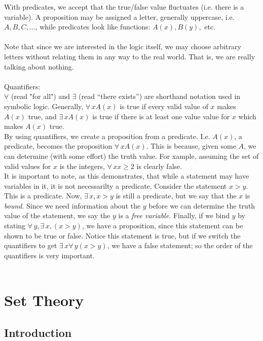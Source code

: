 \documentclass[12pt]{report}
\begin{document}
With predicates, we accept that the true/false value fluctuates (i.e. there is
a variable). A proposition may be assigned a letter, generally uppercase, 
i.e. $A,B,C,...$, while predicates look like functions: $A(x),B(y),$ etc.\\
\\
Note that since we are interested in the logic itself, we may choose arbitrary
letters without relating them in any way to the real world. That is, we are
really talking about nothing. \\
\\
Quantifiers:\\
\indent 
$\forall$ (read "for all") and $\exists$ (read ``there exists'') are shorthand
notation used in symbolic logic. Generally, $\forall\, x A(x)$ is true if every
valid value of $x$ makes $A(x)$ true, and $\exists\, x A(x)$ is true if there is
at least one value value for $x$ which makes $A(x)$ true.  \\
\indent 
By using quantifiers, we create a proposition from a predicate. I.e. $A(x)$, a
predicate, becomes the proposition $\forall\, x A(x)$. This is because, given
some $A$, we can determine (with some effort) the truth value. For xample,
assuming the set of valid values for $x$ is the integers, $\forall\, x x\ge 2$
is clearly false. \\
\indent 
It is important to note, as this demonstrates, that while
a statement may have variables in it, it is not necessarilty a predicate.
Consider the statement $x>y$. This is a predicate. Now, $\exists\, x, x>y$ is
still a predicate, but we say that 
the $x$ is {\em bound}. Since we need information about the $y$ 
before we can determine the truth value of the statement, we say the $y$ is
a {\em free variable}. Finally, if we bind $y$ by stating
$\forall\, y, \exists\, x, (x>y)$, we have a proposition, since this statement can
be shown to be true or false. Notice this statement is true, but if we switch
the quantifiers to get $\exists\, x \forall\, y (x>y)$, we have a false statement;
so the order of the quantifiers is very important.\\
\\

\chapter{Set Theory}

\section{Introduction}
\end{document}
